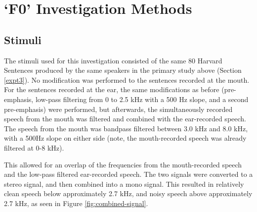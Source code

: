 

\section{`F0' Investigation Methods}
\label{F0-methods}

\subsection{Stimuli}\label{F0-stimuli}

The stimuli used for this investigation consisted of the same 80 Harvard Sentences produced by the same speakers in the primary study above (Section \ref{expt3}).
No modification was performed to the sentences recorded at the mouth.  For the sentences recorded at the ear, the same modifications as before (pre-emphasis, low-pass filtering from 0 to 2.5 kHz with a 500 Hz slope, and a second pre-emphasis) were performed, but afterwards, the simultaneously recorded speech from the mouth was filtered and combined with the ear-recorded speech.  The speech from the mouth was bandpass filtered between 3.0 kHz and 8.0 kHz, with a 500Hz slope on either side (note, the mouth-recorded speech was already filtered at 0-8 kHz).  

This allowed for an overlap of the frequencies from the mouth-recorded speech and the low-pass filtered ear-recorded speech.  The two signals were converted to a stereo signal, and then combined into a mono signal.  This resulted in relatively clean speech below approximately 2.7 kHz, and noisy speech above approximately 2.7 kHz, as seen in Figure \ref{fig:combined-signal}.

